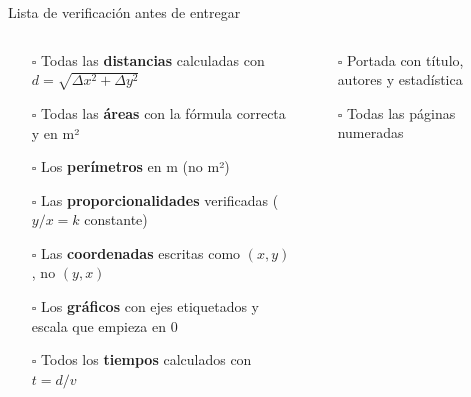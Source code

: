 \documentclass[aspectratio=169, 10pt, spanish]{beamer}
\begin{document}
\begin{frame}{Lista de verificación antes de entregar}
  \begin{columns}[T]
    \begin{column}{0.48\textwidth}
      \begin{tcolorbox}[
        enhanced, colback=AlmVerde!8, colframe=AlmVerde,
        title={\faCheckDouble\enskip Verificación matemática},
        fonttitle=\bfseries\AlmFontSmall\color{AlmBlanco},
        attach boxed title to top left={yshift=-2.2mm, xshift=4mm},
        boxed title style={colback=AlmVerde, arc=3pt, boxrule=0pt},
        arc=4pt]
        \AlmFontFootnote
        \begin{itemize}
          \item[$\square$] Todas las \textbf{distancias} calculadas con
                $d=\sqrt{\Delta x^2+\Delta y^2}$
          \item[$\square$] Todas las \textbf{áreas} con la fórmula correcta
                y en m²
          \item[$\square$] Los \textbf{perímetros} en m (no m²)
          \item[$\square$] Las \textbf{proporcionalidades} verificadas
                ($y/x = k$ constante)
          \item[$\square$] Las \textbf{coordenadas} escritas como $(x,y)$,
                no $(y,x)$
          \item[$\square$] Los \textbf{gráficos} con ejes etiquetados y
                escala que empieza en 0
          \item[$\square$] Todos los \textbf{tiempos} calculados
                con $t = d/v$
        \end{itemize}
      \end{tcolorbox}
    \end{column}
    \begin{column}{0.48\textwidth}
      \begin{tcolorbox}[
        enhanced, colback=AlmAmbar!10, colframe=AlmAmbar!70!black,
        title={\faStickyNote\enskip Verificación de presentación},
        fonttitle=\bfseries\AlmFontSmall\color{AlmAzul},
        attach boxed title to top left={yshift=-2.2mm, xshift=4mm},
        boxed title style={colback=AlmAmbar, coltext=AlmAzul, arc=3pt},
        arc=4pt]
        \AlmFontFootnote
        \begin{itemize}
          \item[$\square$] Portada con título, autores y estadística
          \item[$\square$] Todas las páginas numeradas

\end{itemize}
\end{tcolorbox}
\end{column}
\end{columns}
\end{frame}
\end{document}
